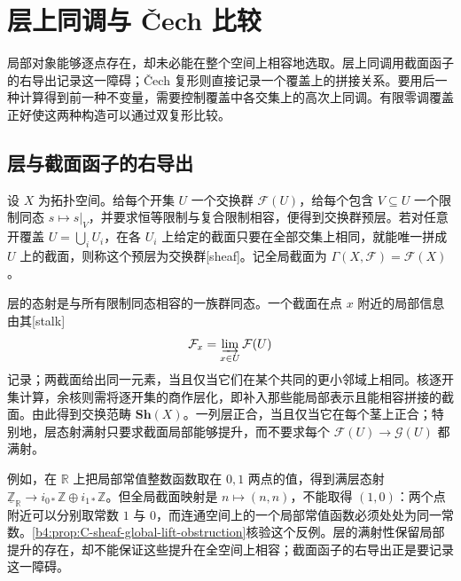 

\section{层上同调与 Čech 比较}
\label{b4:sec:C03}

局部对象能够逐点存在，却未必能在整个空间上相容地选取。层上同调用截面函子的右导出记录这一障碍；Čech 复形则直接记录一个覆盖上的拼接关系。要用后一种计算得到前一种不变量，需要控制覆盖中各交集上的高次上同调。有限零调覆盖正好使这两种构造可以通过双复形比较。

\subsection{层与截面函子的右导出}
\label{b4:subsec:C03:01}

\begin{definition}\label{b4:def:C-sheaf}
	设 \(X\) 为拓扑空间。给每个开集 \(U\) 一个交换群 \(\mathcal F(U)\)，给每个包含 \(V\subseteq U\) 一个限制同态 \(s\mapsto s|_V\)，并要求恒等限制与复合限制相容，便得到交换群预层。若对任意开覆盖 \(U=\bigcup_i U_i\)，在各 \(U_i\) 上给定的截面只要在全部交集上相同，就能唯一拼成 \(U\) 上的截面，则称这个预层为交换群[sheaf]。记全局截面为 \(\Gamma(X,\mathcal F)=\mathcal F(X)\)。
\end{definition}

层的态射是与所有限制同态相容的一族群同态。一个截面在点 \(x\) 附近的局部信息由其[stalk]
\[
	\mathcal F_x=\varinjlim_{x\in U}\mathcal F(U)
\]
记录；两截面给出同一元素，当且仅当它们在某个共同的更小邻域上相同。核逐开集计算，余核则需将逐开集的商作层化，即补入那些能局部表示且能相容拼接的截面。由此得到交换范畴 \(\mathbf{Sh}(X)\)。一列层正合，当且仅当它在每个茎上正合；特别地，层态射满射只要求截面局部能够提升，而不要求每个 \(\mathcal F(U)\rightarrow\mathcal G(U)\) 都满射。

例如，在 \(\mathbb R\) 上把局部常值整数函数取在 \(0,1\) 两点的值，得到满层态射 \(\underline{\mathbb Z}_{\mathbb R}\to i_{0*}\mathbb Z\oplus i_{1*}\mathbb Z\)。但全局截面映射是 \(n\mapsto(n,n)\)，不能取得 \((1,0)\)：两个点附近可以分别取常数 \(1\) 与 \(0\)，而连通空间上的一个局部常值函数必须处处为同一常数。\cref{b4:prop:C-sheaf-global-lift-obstruction}核验这个反例。层的满射性保留局部提升的存在，却不能保证这些提升在全空间上相容；截面函子的右导出正是要记录这一障碍。

